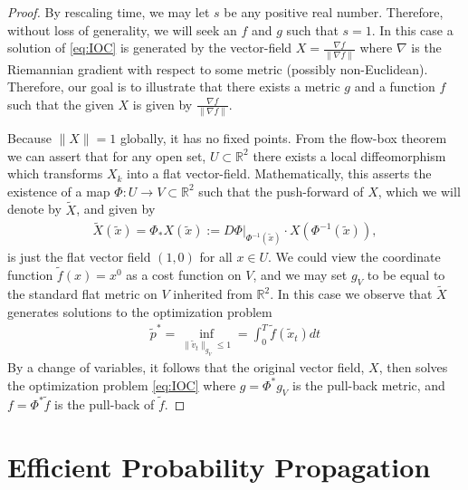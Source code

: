 \documentclass[conference]{IEEEtran}
\begin{document}
\begin{proof}
	By rescaling time, we may let $s$ be any positive real number.
	Therefore, without loss of generality, we will seek an $f$ and $g$ such that $s=1$.
	In this case a solution of \eqref{eq:IOC} is generated by the vector-field $X = \frac{\nabla f}{ \| \nabla f\|}$ where $\nabla$ is the Riemannian gradient with respect to some metric (possibly non-Euclidean).
	Therefore, our goal is to illustrate that there exists a metric $g$ and a function $f$ such that the given $X$ is given by $\frac{\nabla f}{ \| \nabla f\|}$.

	Because $\| X \| = 1$ globally, it has no fixed points.
	From the flow-box theorem \cite[Theorem 4.1.14]{MTA} we can assert that for any open set, $U \subset \mathbb{R}^2$ there exists a local diffeomorphism which transforms $X_k$ into a flat vector-field.
	Mathematically, this asserts the existence of a map $\Phi : U \to V \subset \mathbb{R}^2$ such that the push-forward of $X$, which we will denote by $\tilde{X}$, and given by
	\begin{align*}
		\tilde{X}(\tilde{x}) = \Phi_* X(\tilde{x}) := \left. D\Phi \right|_{\Phi^{-1}(\tilde{x}) } \cdot X(  \Phi^{-1}(\tilde{x}) ),
	\end{align*}
	is just the flat vector field $(1,0)$ for all $x \in U$.
	We could view the coordinate function $\tilde{f}(x) = x^0$ as a cost function on $V$,
	and we may set $g_V$ to be equal to the standard flat metric on $V$ inherited from $\mathbb{R}^2$.
	In this case we observe that $\tilde{X}$ generates solutions to the optimization problem
	\begin{align*}
		\tilde{p}^* = \inf_{ \| \tilde{v}_t \|_{g_V} \leq 1} = \int_0^T \tilde{f}( \tilde{x}_t ) dt
	\end{align*}
	By a change of variables, it follows that the original vector field, $X$, then solves the optimization problem \eqref{eq:IOC}
	where $g = \Phi^* g_V$ is the pull-back metric, and $f = \Phi^* \tilde{f}$ is the pull-back of $\tilde{f}$.
\end{proof}

\section{Efficient Probability Propagation} \label{sec:efficient}

\end{document}

